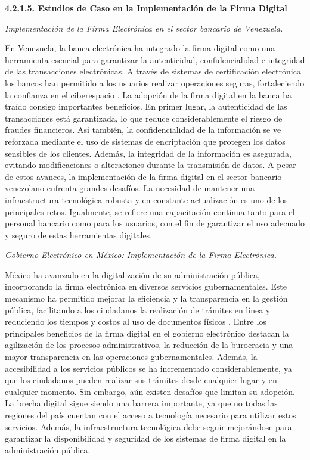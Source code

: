 \documentclass{amsart}
\begin{document}
    
    \textbf{ 4.2.1.5. Estudios de Caso en la Implementación de la Firma Digital }
    
    
    \textit{ Implementación de la Firma Electrónica en el sector bancario de Venezuela. }
    
    En Venezuela, la banca electrónica ha integrado la firma digital como una herramienta esencial para garantizar la autenticidad, confidencialidad e integridad de las transacciones electrónicas. A través de sistemas de certificación electrónica los bancos han permitido a los usuarios realizar operaciones seguras, fortaleciendo la confianza en el ciberespacio \parencite{rincon}.
    La adopción de la firma digital en la banca ha traído consigo importantes beneficios. En primer lugar, la autenticidad de las transacciones está garantizada, lo que reduce considerablemente el riesgo de fraudes financieros. Así también, la confidencialidad de la información se ve reforzada mediante el uso de sistemas de encriptación que protegen los datos sensibles de los clientes. Además, la integridad de la información es asegurada, evitando modificaciones o alteraciones durante la transmisión de datos.
    A pesar de estos avances, la implementación de la firma digital en el sector bancario venezolano enfrenta grandes desafíos. La necesidad de mantener una infraestructura tecnológica robusta y en constante actualización es uno de los principales retos. Igualmente, se refiere una capacitación continua tanto para el personal bancario como para los usuarios, con el fin de garantizar el uso adecuado y seguro de estas herramientas digitales.

    
    \textit{ Gobierno Electrónico en México: Implementación de la Firma Electrónica. }
    
    México ha avanzado en la digitalización de su administración pública, incorporando la firma electrónica en diversos servicios gubernamentales. Este mecanismo ha permitido mejorar la eficiencia y la transparencia en la gestión pública, facilitando a los ciudadanos la realización de trámites en línea y reduciendo los tiempos y costos al uso de documentos físicos \parencite{gilgarcia}.
    Entre los principales beneficios de la firma digital en el gobierno electrónico destacan la agilización de los procesos administrativos, la reducción de la burocracia y una mayor transparencia en las operaciones gubernamentales. Además, la accesibilidad a los servicios públicos se ha incrementado considerablemente, ya que los ciudadanos pueden realizar sus trámites desde cualquier lugar y en cualquier momento.
    Sin embargo, aún existen desafíos que limitan su adopción. La brecha digital sigue siendo una barrera importante, ya que no todas las regiones del país cuentan con el acceso a tecnología necesario para utilizar estos servicios. Además, la infraestructura tecnológica debe seguir mejorándose para garantizar la disponibilidad y seguridad de los sistemas de firma digital en la administración pública.
\end{document}
